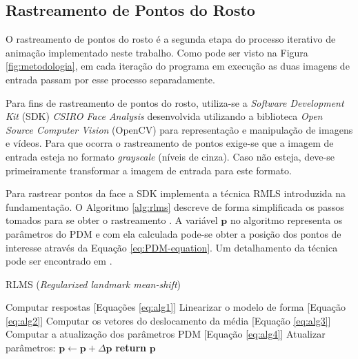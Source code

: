 \subsection{Rastreamento de Pontos do Rosto}

O rastreamento de pontos do rosto é a segunda etapa do processo iterativo de
animação implementado neste trabalho. Como pode ser visto na Figura
\ref{fig:metodologia}, em cada iteração do programa em execução as duas imagens
de entrada passam por esse processo separadamente.

Para fins de rastreamento de pontos do rosto, utiliza-se a
 \textit{Software
Development Kit} (SDK) \textit{CSIRO Face Analysis} \cite{cox2013csiro}
desenvolvida utilizando a biblioteca  \textit{Open Source Computer Vision} (OpenCV) para
representação e manipulação de imagens e vídeos. Para que ocorra o rastreamento
de pontos exige-se que a imagem de entrada esteja no formato \textit{grayscale}
(níveis de cinza). Caso não esteja, deve-se primeiramente transformar a imagem
de entrada para este formato. 

Para rastrear pontos da face a SDK implementa a técnica RMLS introduzida na
fundamentação. O Algoritmo \ref{alg:rlms} descreve de forma simplificada os
passos tomados para se obter o rastreamento \cite{saragih2011deformable}. A
variável $\mathbf{p}$ no algoritmo representa os parâmetros do PDM e com ela
calculada pode-se obter a posição dos pontos de interesse através da Equação
\ref{eq:PDM-equation}. Um detalhamento da técnica pode ser encontrado em
\cite{saragih2011deformable}.

\begin{algorithm}[!htb]
\caption{RLMS (\textit{Regularized landmark mean-shift})}\label{alg:rlms}
\begin{algorithmic}[1]
 
\State Computar respostas [Equações \ref{eq:alg1}]
   \State Linearizar o modelo de forma [Equação \ref{eq:alg2}]
   \State Computar os vetores do deslocamento da média [Equação \ref{eq:alg3}]
   \State Computar a atualização dos parâmetros PDM [Equação \ref{eq:alg4}]
   \State Atualizar parâmetros: $\textbf{p} \leftarrow \textbf{p} + \Delta\textbf{p}$
   \EndWhile
   \State \textbf{return} $\textbf{p}$
\end{algorithmic}
\end{algorithm}





